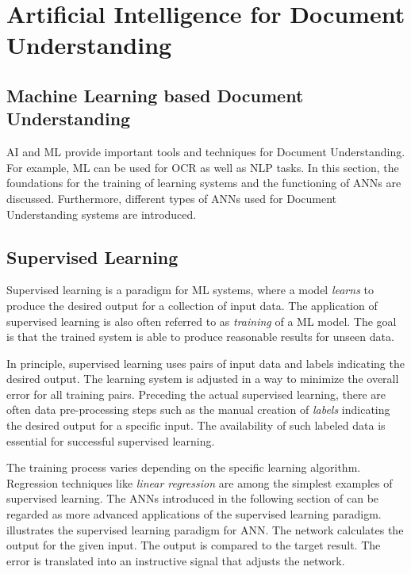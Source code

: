 \section{Artificial Intelligence for Document Understanding}
\subsection{Machine Learning based Document Understanding}
\acl{AI} and \acl{ML} provide important tools and techniques for Document Understanding. For example, \ac{ML} can be used for \ac{OCR} as well as \ac{NLP} tasks. In this section, the foundations for the training of learning systems and the functioning of \acp{ANN} are discussed. Furthermore, different types of \acp{ANN} used for Document Understanding systems are introduced.

\subsection{Supervised Learning}
\label{supervised}
Supervised learning is a paradigm for \ac{ML} systems, where a model \textit{learns} to produce the desired output for a collection of input data. The application of supervised learning is also often referred to as \textit{training} of a \ac{ML} model. The goal is that the trained system is able to produce reasonable results for unseen data.
\cite{haykin2009neural,knudsen1994supervised}

In principle, supervised learning uses pairs of input data and labels indicating the desired output. The learning system is adjusted in a way to minimize the overall error for all training pairs.
Preceding the actual supervised learning, there are often data pre-processing steps such as the manual creation of \textit{labels} indicating the desired output for a specific input. The availability of such labeled data is essential for successful supervised learning.
\cite{haykin2009neural}

The training process varies depending on the specific learning algorithm.
Regression techniques like \textit{linear regression} are among the simplest examples of supervised learning. The \acp{ANN} introduced in the following section of can be regarded as more advanced applications of the supervised learning paradigm. 
 illustrates the supervised learning paradigm for \ac{ANN}. The network calculates the output for the given input. The output is compared to the target result. The error is translated into an instructive signal that adjusts the network. 
\cite{haykin2009neural,knudsen1994supervised}

